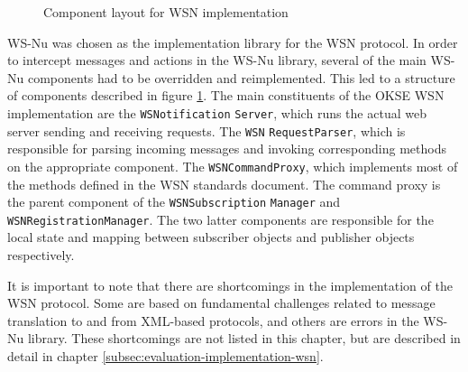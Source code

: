 \begin{center}
  \begin{figure}[ht!]
    \caption{Component layout for WSN implementation}
    \label{fig:wsnotification-server-structure}
  \end{figure}
\end{center}

WS-Nu was chosen as the implementation library for the WSN protocol.
In order to intercept messages and actions in the WS-Nu library, several of the main WS-Nu components had to be overridden and reimplemented. This led to a structure of components described in figure \ref{fig:wsnotification-server-structure}. The main constituents of the OKSE WSN implementation are the \verb!WSNotification! \verb!Server!, which runs the actual web server sending and receiving requests. The \verb!WSN! \verb!RequestParser!, which is responsible for parsing incoming messages and invoking corresponding methods on the appropriate component. The \verb!WSN!\verb!CommandProxy!, which implements most of the methods defined in the WSN standards document. The command proxy is the parent component of the \verb!WSNSubscription! \verb!Manager! and \verb!WSNRegistrationManager!. The two latter components are responsible for the local state and mapping between subscriber objects and publisher objects respectively.

It is important to note that there are shortcomings in the implementation of the WSN protocol. Some are based on fundamental challenges related to message translation to and from XML-based protocols, and others are errors in the WS-Nu library. These shortcomings are not listed in this chapter, but are described in detail in chapter \ref{subsec:evaluation-implementation-wsn}.

